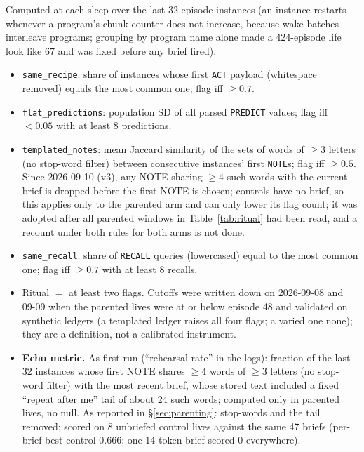 \documentclass{article}
\begin{document}
Computed at each sleep over the last 32 episode instances (an instance restarts whenever a program's chunk counter does not increase, because wake batches interleave programs; grouping by program name alone made a 424-episode life look like 67 and was fixed before any brief fired).
\begin{itemize}
\item \texttt{same\_recipe}: share of instances whose first \texttt{ACT} payload (whitespace removed) equals the most common one; flag iff $\ge 0.7$.
\item \texttt{flat\_predictions}: population SD of all parsed \texttt{PREDICT} values; flag iff $< 0.05$ with at least 8 predictions.
\item \texttt{templated\_notes}: mean Jaccard similarity of the sets of words of $\ge 3$ letters (no stop-word filter) between consecutive instances' first \texttt{NOTE}s; flag iff $\ge 0.5$. Since 2026-09-10 (v3), any NOTE sharing $\ge 4$ such words with the current brief is dropped before the first NOTE is chosen; controls have no brief, so this applies only to the parented arm and can only lower its flag count; it was adopted after all parented windows in Table~\ref{tab:ritual} had been read, and a recount under both rules for both arms is not done.
\item \texttt{same\_recall}: share of \texttt{RECALL} queries (lowercased) equal to the most common one; flag iff $\ge 0.7$ with at least 8 recalls.
\item Ritual $=$ at least two flags. Cutoffs were written down on 2026-09-08 and 09-09 when the parented lives were at or below episode 48 and validated on synthetic ledgers (a templated ledger raises all four flags; a varied one none); they are a definition, not a calibrated instrument.
\item \textbf{Echo metric.} As first run (``rehearsal rate'' in the logs): fraction of the last 32 instances whose first NOTE shares $\ge 4$ words of $\ge 3$ letters (no stop-word filter) with the most recent brief, whose stored text included a fixed ``repeat after me'' tail of about 24 such words; computed only in parented lives, no null. As reported in \S\ref{sec:parenting}: stop-words and the tail removed; scored on 8 unbriefed control lives against the same 47 briefs (per-brief best control 0.666; one 14-token brief scored 0 everywhere).
\end{itemize}
\end{document}
